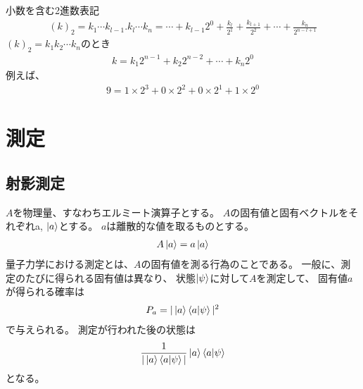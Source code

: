\documentclass[]{ltjsarticle}
\begin{document}
小数を含む2進数表記
\begin{align}
    (k)_2 
    =
    k_1 \cdots k_{l-1}. k_l \cdots k_n
    =
    \cdots + k_{l-1} 2^{0}
    +
    \frac{k_l}{2^1}
    +
    \frac{k_{l+1}}{2^2}
    +
    \cdots
    +
    \frac{k_n}{2^{n-l+1}}
\end{align}
$(k)_2 = k_1 k_2 \cdots k_n$のとき
\begin{align}
    k 
    = 
    k_1 2^{n-1}
    +
    k_2 2^{n-2}
    +
    \cdots
    +
    k_n 2^0
\end{align}
例えば、
\begin{align}
    9 
    = 
    1 \times 2^{3}
    +
    0 \times 2^{2}
    +
    0 \times 2^{1}
    +
    1 \times 2^0
\end{align}





\section{測定}
\subsection{射影測定}
$A$を物理量、すなわちエルミート演算子とする。
$A$の固有値と固有ベクトルをそれぞれa, $\ket{a}$とする。
$a$は離散的な値を取るものとする。
\begin{align}
    A\ket{a} = a\ket{a}
\end{align}
量子力学における測定とは、$A$の固有値を測る行為のことである。
一般に、測定のたびに得られる固有値は異なり、
状態$\ket{\psi}$に対して$A$を測定して、
固有値$a$が得られる確率は
\begin{align}
    P_a = |\ket{a}\braket{a|\psi}|^2
\end{align}
で与えられる。
測定が行われた後の状態は
\begin{align}
    \frac{1}{|\ket{a}\braket{a|\psi}|}\ket{a}\braket{a|\psi}
\end{align}
となる。
\end{document}
